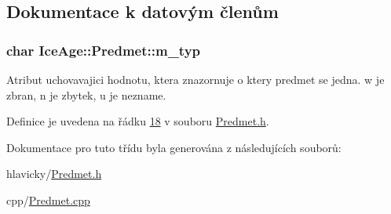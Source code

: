 \subsection{Dokumentace k datovým členům}
\subsubsection[{\texorpdfstring{m\+\_\+typ}{m_typ}}]{\setlength{\rightskip}{0pt plus 5cm}char Ice\+Age\+::\+Predmet\+::m\+\_\+typ\hspace{0.3cm}{\ttfamily [protected]}}\hypertarget{classIceAge_1_1Predmet_a3fe2c66d9696c90e46885f41a19fd9af}{}\label{classIceAge_1_1Predmet_a3fe2c66d9696c90e46885f41a19fd9af}


Atribut uchovavajici hodnotu, ktera znazornuje o ktery predmet se jedna. \textquotesingle{}w\textquotesingle{} je zbran, \textquotesingle{}n\textquotesingle{} je zbytek, \textquotesingle{}u\textquotesingle{} je nezname. 



Definice je uvedena na řádku \hyperlink{Predmet_8h_source_l00018}{18} v souboru \hyperlink{Predmet_8h_source}{Predmet.\+h}.



Dokumentace pro tuto třídu byla generována z následujících souborů\+:\begin{DoxyCompactItemize}
\item 
hlavicky/\hyperlink{Predmet_8h}{Predmet.\+h}\item 
cpp/\hyperlink{Predmet_8cpp}{Predmet.\+cpp}\end{DoxyCompactItemize}
